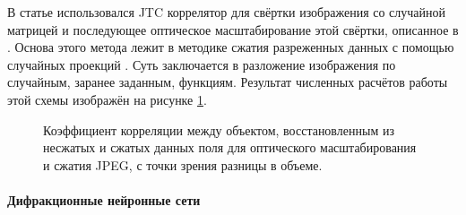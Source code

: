 \FloatBarrier\par
В статье \cite{velez2016optical} использовался JTC коррелятор для свёртки изображения со случайной матрицей и последующее оптическое масштабирование этой свёртки, описанное в \cite{trejos2016optical}. Основа этого метода лежит в методике сжатия разреженных данных с помощью случайных проекций \cite{amador2007random}. Суть заключается в разложение изображения по случайным, заранее заданным, функциям. Результат численных расчётов работы этой схемы изображён на рисунке \ref{ris:RandomProjRes}.
\begin{figure}[h]
	\caption{Коэффициент корреляции между объектом, восстановленным из несжатых и сжатых данных поля для оптического масштабирования и сжатия JPEG, с точки зрения разницы в объеме.}
	\label{ris:RandomProjRes}
\end{figure}





\paragraph{Дифракционные нейронные сети}
